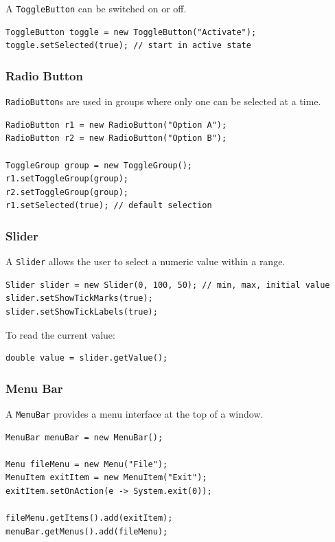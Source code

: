\documentclass{article}
\newcommand{\codecmd}[1]{\textcolor[rgb]{0,0.5,0}{\texttt{#1}}}
\begin{document}
A \codecmd{ToggleButton} can be switched on or off.

\begin{verbatim}
ToggleButton toggle = new ToggleButton("Activate");
toggle.setSelected(true); // start in active state
\end{verbatim}

\subsubsection{Radio Button}

\codecmd{RadioButton}s are used in groups where only one can be selected at a time.

\begin{verbatim}
RadioButton r1 = new RadioButton("Option A");
RadioButton r2 = new RadioButton("Option B");

ToggleGroup group = new ToggleGroup();
r1.setToggleGroup(group);
r2.setToggleGroup(group);
r1.setSelected(true); // default selection
\end{verbatim}

\subsubsection{Slider}

A \codecmd{Slider} allows the user to select a numeric value within a range.

\begin{verbatim}
Slider slider = new Slider(0, 100, 50); // min, max, initial value
slider.setShowTickMarks(true);
slider.setShowTickLabels(true);
\end{verbatim}

To read the current value:
\begin{verbatim}
double value = slider.getValue();
\end{verbatim}

\subsubsection{Menu Bar}

A \codecmd{MenuBar} provides a menu interface at the top of a window.

\begin{verbatim}
MenuBar menuBar = new MenuBar();

Menu fileMenu = new Menu("File");
MenuItem exitItem = new MenuItem("Exit");
exitItem.setOnAction(e -> System.exit(0));

fileMenu.getItems().add(exitItem);
menuBar.getMenus().add(fileMenu);
\end{verbatim}
\end{document}
